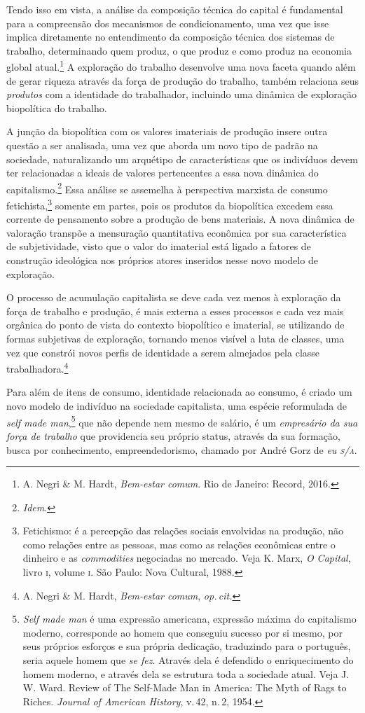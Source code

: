 Tendo isso em vista, a análise da composição técnica do capital é
fundamental para a compreensão dos mecanismos de condicionamento, uma
vez que isse implica diretamente no entendimento da composição técnica
dos sistemas de trabalho, determinando quem produz, o que produz e como
produz na economia global atual.\footnote{A. Negri \& M. Hardt, \textit{Bem-estar comum}. Rio de Janeiro: Record, 2016.} A exploração do
trabalho desenvolve uma nova faceta quando além de gerar riqueza através
da força de produção do trabalho, também relaciona seus \textit{produtos} com
a identidade do trabalhador, incluindo uma dinâmica de exploração
biopolítica do trabalho.

A junção da biopolítica com os valores imateriais de produção insere
outra questão a ser analisada, uma vez que aborda um novo tipo de padrão
na sociedade, naturalizando um arquétipo de características que os
indivíduos devem ter relacionadas a ideais de valores pertencentes a
essa nova dinâmica do capitalismo.\footnote{\textit{Idem}.} Essa análise
se assemelha à perspectiva marxista de consumo fetichista,\footnote{Fetichismo:
  é a percepção das relações sociais envolvidas na produção, não como
  relações entre as pessoas, mas como as relações econômicas entre o
  dinheiro e as \textit{commodities} negociadas no mercado. Veja K. Marx, \textit{O Capital}, livro \textsc{i}, volume \textsc{i}. São Paulo: Nova Cultural, 1988.}
somente em partes, pois os produtos da biopolítica excedem essa corrente
de pensamento sobre a produção de bens materiais. A nova dinâmica de
valoração transpõe a mensuração quantitativa econômica por sua
característica de subjetividade, visto que o valor do imaterial está
ligado a fatores de construção ideológica nos próprios atores inseridos
nesse novo modelo de exploração.

O processo de acumulação capitalista se deve cada vez menos à exploração
da força de trabalho e produção, é mais externa a esses processos e cada
vez mais orgânica do ponto de vista do contexto biopolítico e imaterial,
se utilizando de formas subjetivas de exploração, tornando menos visível
a luta de classes, uma vez que constrói novos perfis de identidade a
serem almejados pela classe trabalhadora.\footnote{A. Negri \& M. Hardt, \textit{Bem-estar comum}, \textit{op.\,cit.}}

Para além de itens de consumo, identidade relacionada ao consumo, é
criado um novo modelo de indivíduo na sociedade capitalista, uma espécie
reformulada de \textit{self made man},\footnote{\textit{Self made man} é uma
  expressão americana, expressão máxima do
  capitalismo moderno, corresponde ao homem que conseguiu sucesso por si
  mesmo, por seus próprios esforços e sua própria dedicação, traduzindo
  para o português, seria aquele homem que \textit{se fez}. Através dela é
  defendido o enriquecimento do homem moderno, e através dela se
  estrutura toda a sociedade atual. Veja J.\,W. Ward. Review of The Self-Made Man in America: The Myth of Rags to Riches. \textit{Journal of American History}, v.\,42, n.\,2, 1954.} que não
depende nem mesmo de salário, é um \textit{empresário da sua força de
trabalho} que providencia seu próprio status, através da sua formação,
busca por conhecimento, empreendedorismo, chamado por André Gorz de \textit{eu
\textsc{s}/\textsc{a}}.

